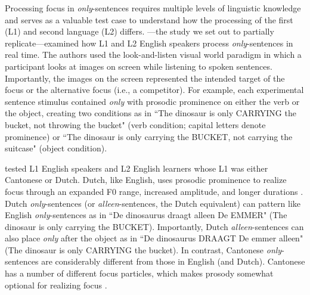 Processing focus in \textit{only}-sentences requires multiple levels of linguistic knowledge and serves as a valuable test case to understand how the processing of the first (L1) and second language (L2) differs. \cite{Ge2021}---the study we set out to partially replicate---examined how L1 and L2 English speakers process \textit{only}-sentences in real time. The authors used the look-and-listen visual world paradigm in which a participant looks at images on screen while listening to spoken sentences. Importantly, the images on the screen represented the intended target of the focus or the alternative focus (i.e., a competitor). For example, each experimental sentence stimulus contained \textit{only} with prosodic prominence on either the verb or the object, creating two conditions as in ``The dinosaur is only CARRYING the bucket, not throwing the bucket" (verb condition; capital letters denote prominence) or ``The dinosaur is only carrying the BUCKET, not carrying the suitcase" (object condition).

\cite{Ge2021} tested L1 English speakers and L2 English learners whose L1 was either Cantonese or Dutch. Dutch, like English, uses prosodic prominence to realize focus through an expanded F0 range, increased amplitude, and longer durations \citep{dimitrova2010focus}. Dutch \textit{only}-sentences (or \textit{alleen}-sentences, the Dutch equivalent) can pattern like English \textit{only}-sentences as in ``De dinosaurus draagt alleen De EMMER" (The dinosaur is only carrying the BUCKET). Importantly, Dutch \textit{alleen}-sentences can also place \textit{only} after the object as in ``De dinosaurus DRAAGT De emmer alleen" (The dinosaur is only CARRYING the bucket). In contrast, Cantonese \textit{only}-sentences are considerably different from those in English (and Dutch). Cantonese has a number of different focus particles, which makes prosody somewhat optional for realizing focus \citep{lee2019focus, wu2010prosodic, ge2024bilingual, fung2000final}. 

